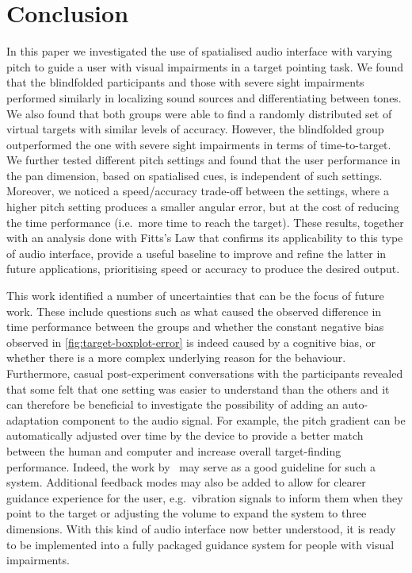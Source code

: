 \documentclass[acmsmall]{acmart}
\begin{document}
\section{Conclusion}\label{sec:conclusion}

In this paper we investigated the use of spatialised audio interface with varying pitch to guide a user with visual impairments in a target pointing task.
We found that the blindfolded participants and those with severe sight impairments performed similarly in localizing sound sources and differentiating between tones. 
We also found that both groups were able to find a randomly distributed set of virtual targets with similar levels of accuracy.
However, the blindfolded group outperformed the one with severe sight impairments in terms of time-to-target. 
We further tested different pitch settings and found that the user performance in the pan dimension, based on spatialised cues, is independent of such settings.
Moreover, we noticed a speed/accuracy trade-off between the settings, where a higher pitch setting produces a smaller angular error, but at the cost of reducing the time performance (i.e.\ more time to reach the target). 
These results, together with an analysis done with Fitts's Law that confirms its applicability to this type of audio interface, provide a useful baseline to improve and refine the latter in future applications, prioritising speed or accuracy to produce the desired output.

This work identified a number of uncertainties that can be the focus of future work.
These include questions such as what caused the observed difference in time performance between the groups and whether the constant negative bias observed in \cref{fig:target-boxplot-error} is indeed caused by a cognitive bias, or whether there is a more complex underlying reason for the behaviour.
Furthermore, casual post-experiment conversations with the participants revealed that some felt that one setting was easier to understand than the others and it can therefore be beneficial to investigate the possibility of adding an auto-adaptation component to the audio signal.
For example, the pitch gradient can be automatically adjusted over time by the device to provide a better match between the human and computer and increase overall target-finding performance.
Indeed, the work by~\citet{gallina2015progressive} may serve as a good guideline for such a system.
Additional feedback modes may also be added to allow for clearer guidance experience for the user, e.g.\ vibration signals to inform them when they point to the target or adjusting the volume to expand the system to three dimensions.
With this kind of audio interface now better understood, it is ready to be implemented into a fully packaged guidance system for people with visual impairments.



\end{document}
